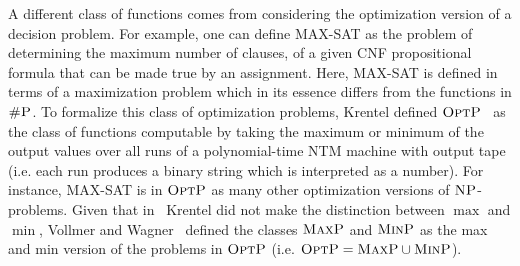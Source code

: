 A different class of functions comes from considering the optimization version of a decision problem. For example, one can define MAX-SAT as the problem of determining the maximum number of clauses, of a given CNF propositional formula that can be made true by an assignment. Here, MAX-SAT is defined in terms of a maximization problem which in its essence differs from the functions in $\text{\sc \#P}$. 
To formalize this class of optimization problems, Krentel defined $\text{\sc OptP}$~\cite{krentel1988complexity} as the class of functions computable by taking the maximum or minimum of the output values over all runs of a polynomial-time NTM machine with output tape (i.e. each run produces a binary string which is interpreted as a number). 
For instance, MAX-SAT is in $\text{\sc OptP}$ as many other optimization versions of $\text{\sc NP}$-problems.
Given that in~\cite{krentel1988complexity} Krentel did not make the distinction between $\max$ and $\min$, Vollmer and Wagner~\cite{vollmer1995complexity} defined the classes $\text{\sc MaxP}$ and $\text{\sc MinP}$ as the max and min version of the problems in $\text{\sc OptP}$ (i.e. $\text{\sc OptP} = \text{\sc MaxP} \cup \text{\sc MinP}$).

